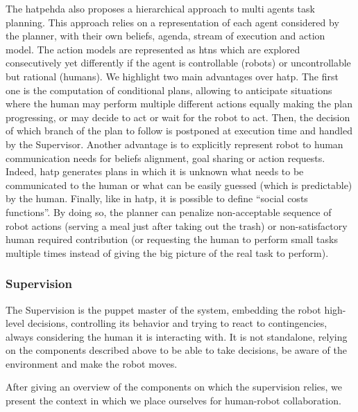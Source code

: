 \documentclass[a4paper,11pt,twoside]{StyleThese}
\begin{document}
The \acrfull{hatpehda} also proposes a hierarchical approach to multi agents task planning. This approach relies on a representation of each agent considered by the planner, with their own beliefs, agenda, stream of execution and action model. The action models are represented as \acrshort{htn}s which are explored consecutively yet differently if the agent is controllable (robots) or uncontrollable but rational (humans). We highlight two main advantages over \acrshort{hatp}. The first one is the computation of conditional plans, allowing to anticipate situations where the human may perform multiple different actions equally making the plan progressing, or may decide to act or wait for the robot to act. Then, the decision of which branch of the plan to follow is postponed at execution time and handled by the Supervisor. Another advantage is to explicitly represent robot to human communication needs for beliefs alignment, goal sharing or action requests. Indeed, \acrshort{hatp} generates plans in which it is unknown what needs to be communicated to the human or what can be easily guessed (\ie which is predictable) by the human. Finally, like in \acrshort{hatp}, it is possible to define ``social costs functions''. By doing so, the planner can penalize non-acceptable sequence of robot actions (\eg serving a meal just after taking out the trash) or non-satisfactory human required contribution (\eg or requesting the human to perform small tasks multiple times instead of giving the big picture of the real task to perform).


\subsubsection{Supervision}
The Supervision is the puppet master of the system, embedding the robot high-level decisions, controlling its behavior and trying to react to contingencies, always considering the human it is interacting with. It is not standalone, relying on the components described above to be able to take decisions, be aware of the environment and make the robot moves.
\newline

After giving an overview of the components on which the supervision relies, we present the context in which we place ourselves for human-robot collaboration.



\ifdefined{}
\else


\end{document}
